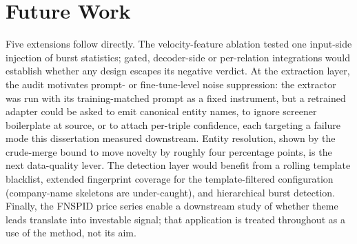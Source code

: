 \documentclass[a4paper,12pt]{report}
\begin{document}
\section{Future Work}
Five extensions follow directly. The velocity-feature ablation tested one
input-side injection of burst statistics; gated, decoder-side or
per-relation integrations would establish whether any design escapes its
negative verdict. At the extraction layer, the audit motivates prompt- or
fine-tune-level noise suppression: the extractor was run with its
training-matched prompt as a fixed instrument, but a retrained adapter
could be asked to emit canonical entity names, to ignore screener
boilerplate at source, or to attach per-triple confidence, each targeting a
failure mode this dissertation measured downstream. Entity resolution, shown by the crude-merge
bound to move novelty by roughly four percentage points, is the next
data-quality lever. The detection layer would benefit from a rolling template
blacklist, extended fingerprint coverage for the template-filtered
configuration (company-name skeletons are under-caught), and hierarchical
burst detection. Finally, the FNSPID price series enable a downstream study of whether
theme leads translate into investable signal; that application is treated
throughout as a use of the method, not its aim.
\end{document}
